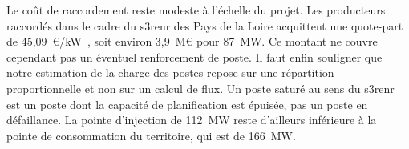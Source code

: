 Le coût de raccordement reste modeste à l'échelle du projet. Les producteurs raccordés dans le cadre du \gls{s3renr} des Pays de la Loire acquittent une quote-part de 45,09~€/kW~\cite{dreal_s3renr}, soit environ 3,9~M€ pour 87~MW. Ce montant ne couvre cependant pas un éventuel renforcement de poste. Il faut enfin souligner que notre estimation de la charge des postes repose sur une répartition proportionnelle et non sur un calcul de flux. Un poste \og saturé \fg{} au sens du \gls{s3renr} est un poste dont la capacité de planification est épuisée, pas un poste en défaillance. La pointe d'injection de 112~MW reste d'ailleurs inférieure à la pointe de consommation du territoire, qui est de 166~MW.
